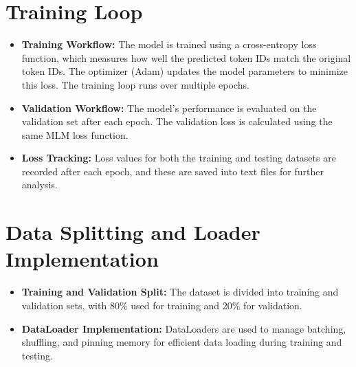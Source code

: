 \section{Training Loop}
\begin{itemize}
    \item \textbf{Training Workflow:} The model is trained using a cross-entropy loss function, which measures how well the predicted token IDs match the original token IDs. The optimizer (Adam) updates the model parameters to minimize this loss. The training loop runs over multiple epochs.
    \item \textbf{Validation Workflow:} The model's performance is evaluated on the validation set after each epoch. The validation loss is calculated using the same MLM loss function.
    \item \textbf{Loss Tracking:} Loss values for both the training and testing datasets are recorded after each epoch, and these are saved into text files for further analysis.
\end{itemize}

\section{Data Splitting and Loader Implementation}
\begin{itemize}
    \item \textbf{Training and Validation Split:} The dataset is divided into training and validation sets, with 80\% used for training and 20\% for validation.
    \item \textbf{DataLoader Implementation:} DataLoaders are used to manage batching, shuffling, and pinning memory for efficient data loading during training and testing.
\end{itemize}

